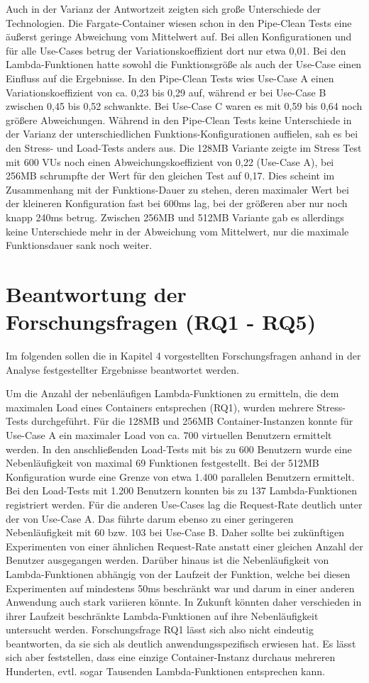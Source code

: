 Auch in der Varianz der Antwortzeit zeigten sich große Unterschiede der Technologien. Die Fargate-Container wiesen schon in den Pipe-Clean Tests eine äußerst geringe Abweichung vom Mittelwert auf. Bei allen Konfigurationen und für alle Use-Cases betrug der Variationskoeffizient dort nur etwa 0,01. Bei den Lambda-Funktionen hatte sowohl die Funktionsgröße als auch der Use-Case einen Einfluss auf die Ergebnisse. In den Pipe-Clean Tests wies Use-Case A einen Variationskoeffizient von ca. 0,23 bis 0,29 auf, während er bei Use-Case B zwischen 0,45 bis 0,52 schwankte. Bei Use-Case C waren es mit 0,59 bis 0,64 noch größere Abweichungen. Während in den Pipe-Clean Tests keine Unterschiede in der Varianz der unterschiedlichen Funktions-Konfigurationen auffielen, sah es bei den Stress- und Load-Tests anders aus. Die 128MB Variante zeigte im Stress Test mit 600 VUs noch einen Abweichungskoeffizient von 0,22 (Use-Case A), bei 256MB schrumpfte der Wert für den gleichen Test auf 0,17. Dies scheint im Zusammenhang mit der Funktions-Dauer zu stehen, deren maximaler Wert bei der kleineren Konfiguration fast bei 600ms lag, bei der größeren aber nur noch knapp 240ms betrug. Zwischen 256MB und 512MB Variante gab es allerdings keine Unterschiede mehr in der Abweichung vom Mittelwert, nur die maximale Funktionsdauer sank noch weiter.

\section{Beantwortung der Forschungsfragen (RQ1 - RQ5)}
Im folgenden sollen die in Kapitel 4 vorgestellten Forschungsfragen anhand in der Analyse festgestellter Ergebnisse beantwortet werden.

Um die Anzahl der nebenläufigen Lambda-Funktionen zu ermitteln, die dem maximalen Load eines Containers entsprechen (RQ1), wurden mehrere Stress-Tests durchgeführt. Für die 128MB und 256MB Container-Instanzen konnte für Use-Case A ein maximaler Load von ca. 700 virtuellen Benutzern ermittelt werden. In den anschließenden Load-Tests mit bis zu 600 Benutzern wurde eine Nebenläufigkeit von maximal 69 Funktionen festgestellt. Bei der 512MB Konfiguration wurde eine Grenze von etwa 1.400 parallelen Benutzern ermittelt. Bei den Load-Tests mit 1.200 Benutzern konnten bis zu 137 Lambda-Funktionen registriert werden. 
Für die anderen Use-Cases lag die Request-Rate deutlich unter der von Use-Case A. Das führte darum ebenso zu einer geringeren Nebenläufigkeit mit 60 bzw. 103 bei Use-Case B. Daher sollte bei zukünftigen Experimenten von einer ähnlichen Request-Rate anstatt einer gleichen Anzahl der Benutzer ausgegangen werden.
Darüber hinaus ist die Nebenläufigkeit von Lambda-Funktionen abhängig von der Laufzeit der Funktion, welche bei diesen Experimenten auf mindestens 50ms beschränkt war und darum in einer anderen Anwendung auch stark variieren könnte. In Zukunft könnten daher verschieden in ihrer Laufzeit beschränkte Lambda-Funktionen auf ihre Nebenläufigkeit untersucht werden.
Forschungsfrage RQ1 lässt sich also nicht eindeutig beantworten, da sie sich als deutlich anwendungsspezifisch erwiesen hat. Es lässt sich aber feststellen, dass eine einzige Container-Instanz durchaus mehreren Hunderten, evtl. sogar Tausenden Lambda-Funktionen entsprechen kann.


